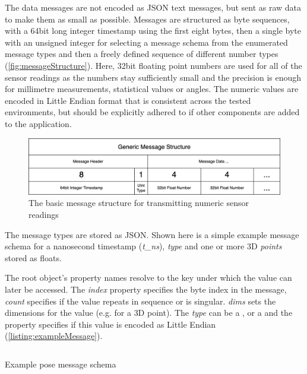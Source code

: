 The data messages are not encoded as \ac{JSON} text messages, but sent as raw data to make them as small as possible.
Messages are structured as byte sequences, with a 64bit long integer timestamp using the first eight bytes, then a single byte with an unsigned integer for selecting a message schema from the enumerated message types and then a freely defined sequence of different number types (\autoref{fig:messageStructure}). Here, 32bit floating point numbers are used for all of the sensor readings as the numbers stay sufficiently small and the precision is enough for millimetre measurements, statistical values or angles.
The numeric values are encoded in Little Endian format that is consistent across the tested environments, but should be explicitly adhered to if other components are added to the application.

\begin{figure}[h]
\centering
\includegraphics[width=\textwidth]{04_Artefakte/01_Abbildungen/generic-message-structure}
\caption[Generic Message Structure]{The basic message structure for transmitting numeric sensor readings\protect}
\label{fig:messageStructure}
\end{figure}

The message types are stored as JSON. Shown here is a simple example message schema for a nanosecond timestamp (\emph{{t\_ns}}), \emph{type} and one or more \ac{3D} \emph{points} stored as floats.

The root object's property names resolve to the key under which the value can later be accessed.
The \emph{index} property specifies the byte index in the message, \emph{count} specifies if the value repeats in sequence or is singular. \emph{dims} sets the dimensions for the value (e.g.  for a \ac{3D} point).
The \emph{type} can be a ,  or a  and the property  specifies if this value is encoded as Little Endian (\autoref{listing:exampleMessage}).

\begin{listing}[!ht]
\inputminted{json}{04_Artefakte/03_Listings/example-pose-message.json}
\caption{Example pose message schema}
\label{listing:exampleMessage}
\end{listing}

